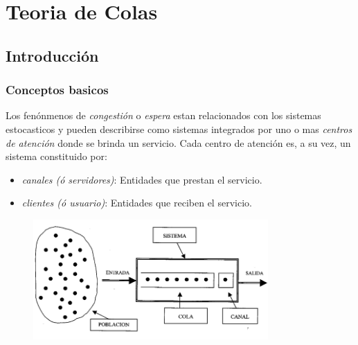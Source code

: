 \documentclass{article}
\begin{document}
\newpage{}
\tableofcontents
\newpage{}

\newpage
\section{Teoria de Colas}

\subsection{Introducción}
\subsubsection{Conceptos basicos}

Los fenónmenos de \textit{congestión} o \textit{espera} estan relacionados con los sistemas estocasticos y pueden describirse como sistemas integrados por uno o mas \textit{centros de atención} donde se brinda un servicio.
Cada centro de atención es, a su vez, un sistema constituido por:

\begin{itemize}
    \item \textit{canales (ó servidores)}: Entidades que prestan el servicio. 
    \item \textit{clientes (ó usuario)}: Entidades que reciben el servicio. 
\end{itemize}

    \begin{figure}[h!]
        \includegraphics[width=0.8\textwidth]{imagenes/modelo_sistema.png}
    \end{figure}
\end{document}
